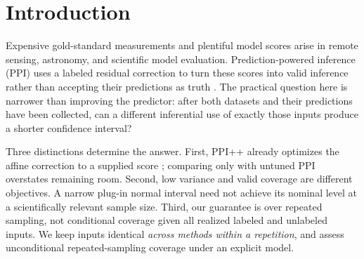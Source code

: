 \documentclass{article}
\begin{document}
\printAffiliationsAndNotice{}
\begin{abstract}
Can confidence intervals become narrower when labels, unlabeled observations, and a supplied predictor cannot change? For binary population means, we separate nonlinear information in an immutable score from the cost of exploiting it with valid inference. A control-variate decomposition characterizes the oracle variance improvement beyond affine PPI++, while pilot-conditioned binary component intervals provide finite-sample coverage without retraining the base predictor. In a prespecified low-disagreement synthetic setting, the latter intervals reduce mean width by \ExactGain\% (paired 95\% Monte Carlo interval: \ExactGainLo--\ExactGainHi\%) against full-budget exact label-only intervals. The gain disappears with a smaller unlabeled pool, higher disagreement, and two real empirical populations; a larger \NonlinearGain\% Wald reduction instead exhibits undercoverage. These are conditional-gain and negative-result findings, not a new general PPI principle, an exhaustive literature comparison, or a claim of universally shorter valid intervals.
\end{abstract}

\section{Introduction}
Expensive gold-standard measurements and plentiful model scores arise in remote sensing, astronomy, and scientific model evaluation. Prediction-powered inference (PPI) uses a labeled residual correction to turn these scores into valid inference rather than accepting their predictions as truth \citep{angelopoulos2023ppi}. The practical question here is narrower than improving the predictor: after both datasets and their predictions have been collected, can a different inferential use of exactly those inputs produce a shorter confidence interval?

Three distinctions determine the answer. First, PPI++ already optimizes the affine correction to a supplied score \citep{angelopoulos2024ppiplus}; comparing only with untuned PPI overstates remaining room. Second, low variance and valid coverage are different objectives. A narrow plug-in normal interval need not achieve its nominal level at a scientifically relevant sample size. Third, our guarantee is over repeated sampling, not conditional coverage given all realized labeled and unlabeled inputs. We keep inputs identical \emph{across methods within a repetition}, and assess unconditional repeated-sampling coverage under an explicit model.
\end{document}

